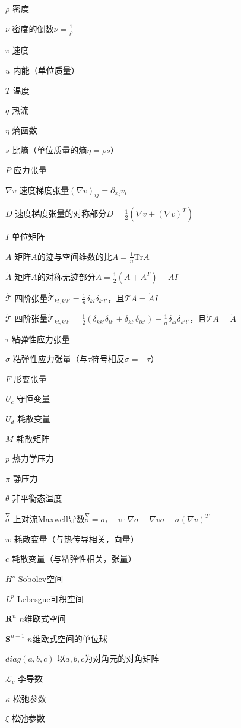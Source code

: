 \begin{denotation}[3cm]

\item[$\rho$] 密度
\item[$\nu$] 密度的倒数$\nu=\frac{1}{\rho}$
\item[$v$] 速度
\item[$u$] 内能（单位质量）
\item[$T$] 温度
\item[$q$] 热流
\item[$\eta$] 熵函数
\item[$s$] 比熵（单位质量的熵$\eta = \rho s$）
\item[$P$] 应力张量
\item[$\nabla v$] 速度梯度张量$(\nabla v)_{ij} = \partial_{x_j} v_i$
\item[$D$] 速度梯度张量的对称部分$D = \frac{1}{2}(\nabla v + (\nabla v)^T)$
\item[$I$] 单位矩阵
\item[$\dot{A}$] 矩阵$A$的迹与空间维数的比$\dot{A} = \frac{1}{n} \mbox{Tr} A$
\item[$\mathring{A}$] 矩阵$A$的对称无迹部分$\mathring{A} = \frac{1}{2}(A+A^T) - \dot{A}I$
\item[$\dot{\mathcal{T}}$] 四阶张量$\dot{\mathcal{T}}_{kl,k'l'} = \frac{1}{n}\delta_{kl} \delta_{k'l'}$，且$\dot{\mathcal{T}} A = \dot{A} I$
\item[$\mathring{\mathcal{T}}$] 四阶张量$\mathring{\mathcal{T}}_{kl,k'l'} =\frac{1}{2}(\delta_{kk'}\delta_{ll'} + \delta_{kl'} \delta_{lk'} ) -\frac{1}{n}\delta_{kl} \delta_{k'l'} $，且$\mathring{\mathcal{T}} A = \mathring{A}$
\item[$\tau$] 粘弹性应力张量
\item[$\sigma$] 粘弹性应力张量（与$\tau$符号相反$\sigma=-\tau$）
\item[$F$] 形变张量
\item[$U_c$] 守恒变量
\item[$U_d$] 耗散变量
\item[$M$] 耗散矩阵
\item[$p$] 热力学压力
\item[$\pi$] 静压力
\item[$\theta$] 非平衡态温度
\item[$\stackrel{\nabla} \sigma$] 上对流Maxwell导数$\stackrel{\nabla} \sigma = \sigma_t + v \cdot \nabla \sigma - \nabla v \sigma - \sigma (\nabla v)^T$
\item[$w$] 耗散变量（与热传导相关，向量）
\item[$c$] 耗散变量（与粘弹性相关，张量）
\item[$H^s$] Sobolev空间
\item[$L^p$] Lebesgue可积空间
\item[$\mathbf{R}^n$] $n$维欧式空间
\item[$\mathbf{S}^{n-1}$] $n$维欧式空间的单位球
\item[$diag(a,b,c)$] 以$a,b,c$为对角元的对角矩阵
\item[$\mathcal{L}_v$] 李导数 
\item[$\kappa$] 松弛参数
\item[$\xi$] 松弛参数

\end{denotation}
